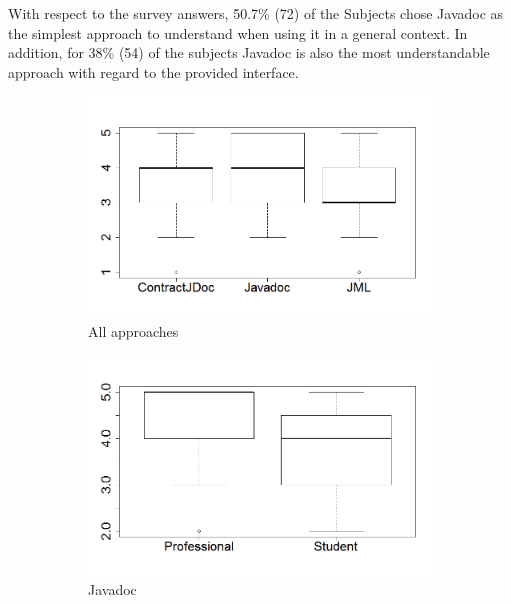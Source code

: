 With respect to the survey answers, 50.7\% (72) of the Subjects chose Javadoc as
the simplest approach to understand when using it in a general context. In addition,
for 38\% (54) of the subjects Javadoc is also the most understandable approach
with regard to the provided interface.

\begin{figure}
\centering
\begin{subfigure}{.48\textwidth}
\includegraphics[width=1\linewidth]{figs/boxplotApproachesSurveyStudy}
\caption{All approaches}
\label{fig:allApproaches}
\end{subfigure}
\begin{subfigure}{.48\textwidth}
\includegraphics[width=1\linewidth]{figs/boxPlotJavadocXExperience}
\caption{Javadoc}
\label{fig:javadocExp}
\end{subfigure}
\\[1ex]
\begin{subfigure}{.48\textwidth}

\end{subfigure}
\end{figure}
